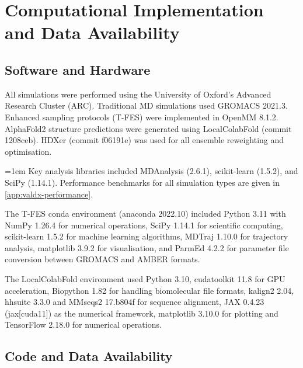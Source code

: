 \clearpage
\section{Computational Implementation and Data Availability}
\label{app:valdx-implementation}

\subsection{Software and Hardware}
\label{app:valdx-software}

All simulations were performed using the University of Oxford's Advanced Research Cluster (ARC).\supercite{richardsUniversityOxfordAdvanced2015} Traditional MD simulations used GROMACS 2021.3.\supercite{abrahamGROMACSHighPerformance2015} Enhanced sampling protocols (T-FES) were implemented in OpenMM 8.1.2.\supercite{eastmanOpenMM7Rapid2017} AlphaFold2 structure predictions were generated using LocalColabFold (commit 1208ceb).\supercite{mirditaColabFoldMakingProtein2022,jumperHighlyAccurateProtein2021} HDXer (commit f06191e) was used for all ensemble reweighting and optimisation.\supercite{bradshawInterpretationHDXData2020}

{\emergencystretch=1em Key analysis libraries included MDAnalysis (2.6.1),\supercite{gowersMDAnalysisPythonPackage2019a} scikit-learn (1.5.2),\supercite{pedregosaScikitlearnMachineLearning2011} and SciPy (1.14.1).\supercite{virtanenSciPy10Fundamental2020} Performance benchmarks for all simulation types are given in \cref{app:valdx-performance}.\par}

The T-FES conda environment (anaconda 2022.10) included Python 3.11 with NumPy 1.26.4 for numerical operations, SciPy 1.14.1 for scientific computing, scikit-learn 1.5.2 for machine learning algorithms, MDTraj 1.10.0 for trajectory analysis, matplotlib 3.9.2 for visualisation, and ParmEd 4.2.2 for parameter file conversion between GROMACS and AMBER formats.

The LocalColabFold environment used Python 3.10, cudatoolkit 11.8 for GPU acceleration, Biopython 1.82 for handling biomolecular file formats, kalign2 2.04, hhsuite 3.3.0 and MMseqs2 17.b804f for sequence alignment, JAX 0.4.23 (jax[cuda11]) as the numerical framework, matplotlib 3.10.0 for plotting and TensorFlow 2.18.0 for numerical operations.

\subsection{Code and Data Availability}
\label{app:valdx-code-data}

